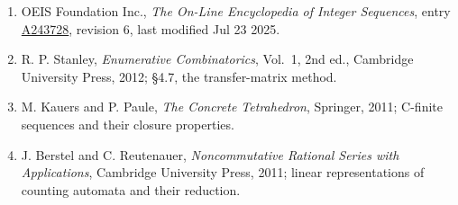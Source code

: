 \documentclass[11pt]{article}
\theoremstyle{definition}
\begin{document}
\begin{enumerate}

\item OEIS Foundation Inc., \emph{The On-Line Encyclopedia of Integer Sequences}, entry \href{https://oeis.org/A243728}{A243728}, revision 6, last modified Jul 23 2025.

\item R. P. Stanley, \emph{Enumerative Combinatorics}, Vol.~1, 2nd ed., Cambridge University Press, 2012; \S4.7, the transfer-matrix method.

\item M. Kauers and P. Paule, \emph{The Concrete Tetrahedron}, Springer, 2011; C-finite sequences and their closure properties.

\item J. Berstel and C. Reutenauer, \emph{Noncommutative Rational Series with Applications}, Cambridge University Press, 2011; linear representations of counting automata and their reduction.

\end{enumerate}
\end{document}
